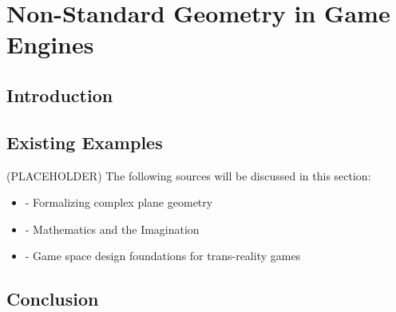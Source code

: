 \section{Non-Standard Geometry in Game Engines}
\label{lr:ne}

	\subsection{Introduction}
	\label{lr:ne:intro}
	
	\subsection{Existing Examples}
	\label{lr:ne:existing}
		(PLACEHOLDER) The following sources will be discussed in this section:
		\begin{itemize}
			\item \cite{Maric2014} - Formalizing complex plane geometry
			\item \cite{Turner2009} - Mathematics and the Imagination
			\item \cite{Lindley2005} - Game space design foundations for trans-reality games
		\end{itemize}
		
	\subsection{Conclusion}
	\label{lr:ne:conclusion}
